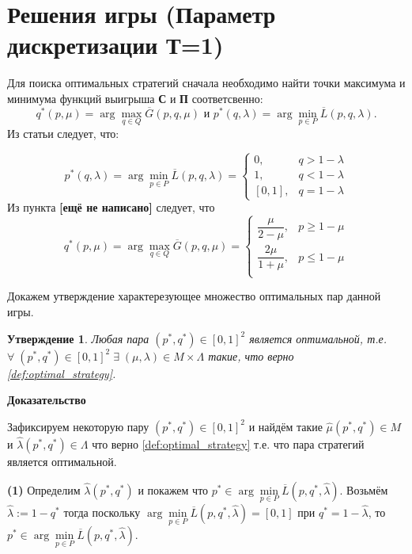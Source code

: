 \section{Решения игры (Параметр дискретизации Т=1)}

Для поиска оптимальных стратегий сначала необходимо найти точки максимума и минимума 
функций выигрыша \textbf{С} и \textbf{П} соответсвенно:
$$
	q^*(p, \mu) = \arg \max \limits_{q \in Q} \overline G(p, q, \mu)
	\textrm{ и }
	p^*(q, \lambda) = \arg \min \limits_{p \in P} \overline L(p, q, \lambda).
$$
Из статьи \cite{novikova} следует, что:

\begin{equation}
	p^*(q, \lambda)=
	\arg \min \limits_{p \in P} \overline L(p, q, \lambda) =
	\begin{cases}
		0, & q > 1 - \lambda \\
		1, & q < 1 - \lambda \\
		[0,1], & q = 1 - \lambda
	\end{cases}
	\label{eq:argmin_L_1}
\end{equation}
Из пункта \textbf{[ещё не написано]} следует, что
\begin{equation}
	q^*(p, \mu) = \arg \max \limits_{q \in Q} \overline G(p, q, \mu) =
	\begin{cases}
		\dfrac{\mu}{2 - \mu}, & p \geqslant 1 - \mu \\
		\dfrac{2\mu}{1 + \mu}, & p \leqslant 1 -\mu \\
	\end{cases}
	\label{eq:argmax_G_1}
\end{equation}

Докажем утверждение характерезующее множество оптимальных пар данной игры.

\newtheorem{State}{Утверждение}\label{State:opt_strat_1}
\begin{State}
	Любая пара $(p^*, q^*) \in [0, 1]^2$ является оптимальной, т.е.  
	$\forall \; (p^*, q^*) \in [0, 1]^2 \; \exists \; 
	(\mu, \lambda) \in M \times \Lambda$
	такие, что верно \eqref{def:optimal_strategy}.
\end{State}


\textbf{Доказательство}

Зафиксируем некоторую пару  $(p^*, q^*) \in [0, 1]^2$ и найдём такие 
$\hat \mu (p^*, q^*) \in M$ и $\hat \lambda (p^*, q^*) \in \Lambda$ 
что верно \eqref{def:optimal_strategy} т.е. что пара стратегий является оптимальной.

\textbf{(1)} Определим $\hat \lambda(p^*, q^*)$ и покажем что 
$p^* \in \arg \min \limits_{p \in P} \overline L(p, q^*, \hat \lambda)$.
Возьмём $\hat \lambda := 1 - q^*$ тогда поскольку 
$\arg \min\limits_{p \in P} \overline L(p, q^*, \hat \lambda) = [0,1]$ 
при $ q^* = 1 - \hat \lambda$, 
то $p^* \in \arg \min \limits_{p \in P} \overline L(p, q^*, \hat \lambda)$.

